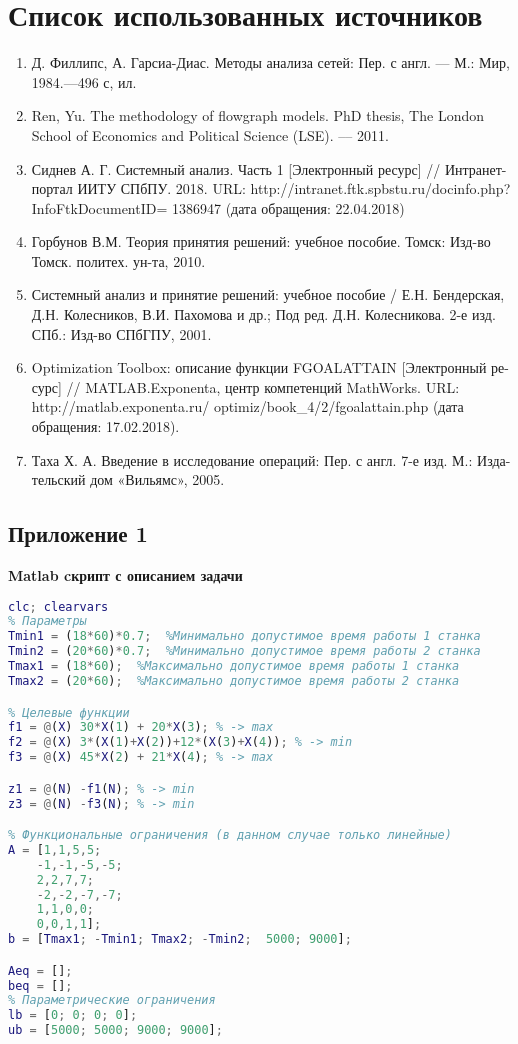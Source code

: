 \chapter*{Список использованных источников}
\begin{enumerate}
\item Д. Филлипс, А. Гарсиа-Диас. Методы анализа сетей: Пер. с англ. — М.: Мир, 1984.—496 с, ил.
\item Ren, Yu. The methodology of flowgraph models. PhD thesis, The London School of Economics and Political Science (LSE). –– 2011.
\item Сиднев А. Г. Системный анализ. Часть 1 [Электронный ресурс] // Интранет-
портал ИИТУ СПбПУ. 2018. URL: http://intranet.ftk.spbstu.ru/docinfo.php?InfoFtkDocumentID= 1386947 (дата обращения: 22.04.2018)
\item Горбунов В.М. Теория принятия решений: учебное пособие. Томск: Изд-во
Томск. политех. ун-та, 2010.
\item Системный анализ и принятие решений: учебное пособие / Е.Н. Бендерская,
Д.Н. Колесников, В.И. Пахомова и др.; Под ред. Д.Н. Колесникова. 2-е изд.
СПб.: Изд-во СПбГПУ, 2001.
\item Optimization Toolbox: описание функции FGOALATTAIN [Электронный ре-
сурс] // MATLAB.Exponenta, центр компетенций MathWorks. URL:
http://matlab.exponenta.ru/ optimiz/book\_4/2/fgoalattain.php (дата обращения:
17.02.2018).
\item Таха Х. А. Введение в исследование операций: Пер. с англ. 7-е изд. М.: Изда-тельский дом «Вильямс», 2005.
\end{enumerate}


%
%


\clearpage
{}
\setcounter{section}{0}
\section*{Приложение 1} \label{p1:1}
\textbf{Matlab cкрипт с описанием задачи}
\begin{lstlisting}[language={matlab}, caption={Скрипт с описанием задачи}, label={lst:0}]
clc; clearvars
% Параметры
Tmin1 = (18*60)*0.7;  %Минимально допустимое время работы 1 станка
Tmin2 = (20*60)*0.7;  %Минимально допустимое время работы 2 станка
Tmax1 = (18*60);  %Максимально допустимое время работы 1 станка
Tmax2 = (20*60);  %Максимально допустимое время работы 2 станка

% Целевые функции
f1 = @(X) 30*X(1) + 20*X(3); % -> max
f2 = @(X) 3*(X(1)+X(2))+12*(X(3)+X(4)); % -> min
f3 = @(X) 45*X(2) + 21*X(4); % -> max

z1 = @(N) -f1(N); % -> min
z3 = @(N) -f3(N); % -> min

% Функциональные ограничения (в данном случае только линейные)
A = [1,1,5,5;
    -1,-1,-5,-5;
    2,2,7,7;
    -2,-2,-7,-7;
    1,1,0,0;
    0,0,1,1];
b = [Tmax1; -Tmin1; Tmax2; -Tmin2;  5000; 9000];

Aeq = [];
beq = [];
% Параметрические ограничения
lb = [0; 0; 0; 0];
ub = [5000; 5000; 9000; 9000];
\end{lstlisting}


